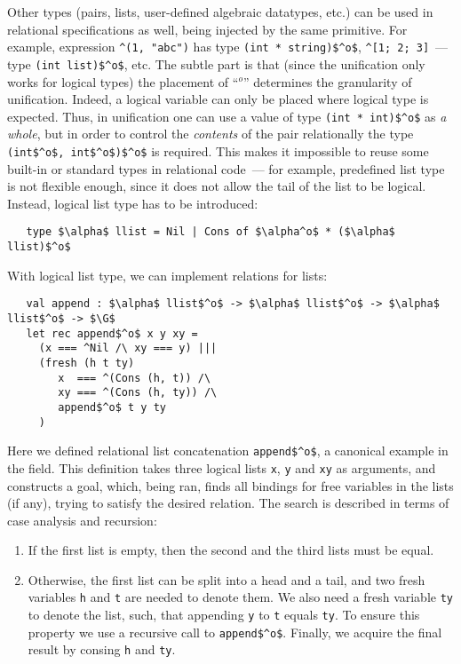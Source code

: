 Other types (pairs, lists, user-defined algebraic datatypes, etc.) can be used in relational specifications as well, being injected by the same primitive. For example, expression \lstinline{^(1, "abc")} has type \lstinline{(int * string)$^o$}, \lstinline{^[1; 2; 3]}~--- type \lstinline{(int list)$^o$}, etc. The subtle part is that (since the unification only works for logical types) the placement of ``$^o$'' determines the granularity of unification. Indeed, a logical variable can only be placed where logical type is expected. Thus, in unification one can use a value of type \lstinline{(int * int)$^o$} as \emph{a whole}, but in order to control the \emph{contents} of the pair relationally the type \lstinline{(int$^o$, int$^o$)$^o$} is required. This makes it impossible to reuse some built-in or standard types in relational code~--- for example, predefined list type is not flexible enough, since it does not allow the tail of the list to be logical. Instead, logical list type has to be introduced:

\begin{lstlisting}
   type $\alpha$ llist = Nil | Cons of $\alpha^o$ * ($\alpha$ llist)$^o$
\end{lstlisting}

With logical list type, we can implement relations for lists:

\begin{lstlisting}
   val append : $\alpha$ llist$^o$ -> $\alpha$ llist$^o$ -> $\alpha$ llist$^o$ -> $\G$
   let rec append$^o$ x y xy =
     (x === ^Nil /\ xy === y) |||
     (fresh (h t ty)
        x  === ^(Cons (h, t)) /\
        xy === ^(Cons (h, ty)) /\
        append$^o$ t y ty
     ) 
\end{lstlisting}

Here we defined relational list concatenation \lstinline{append$^o$}, a canonical example in the field. This definition takes three logical lists \lstinline{x}, \lstinline{y} and \lstinline{xy} as arguments, and constructs a goal, which, being ran, finds all bindings for free variables in the lists (if any), trying to satisfy the desired relation. The search is described in terms of case analysis and recursion:

\begin{enumerate}
\item If the first list is empty, then the second and the third lists must be equal.
\item Otherwise, the first list can be split into a head and a tail, and two fresh variables \lstinline{h} and \lstinline{t} are needed to denote them. We also need a fresh variable \lstinline{ty} to denote the list, such, that appending \lstinline{y} to \lstinline{t} equals \lstinline{ty}. To ensure this property we use a recursive call to \lstinline{append$^o$}. Finally, we acquire the final result by consing \lstinline{h} and \lstinline{ty}. 
\end{enumerate}

